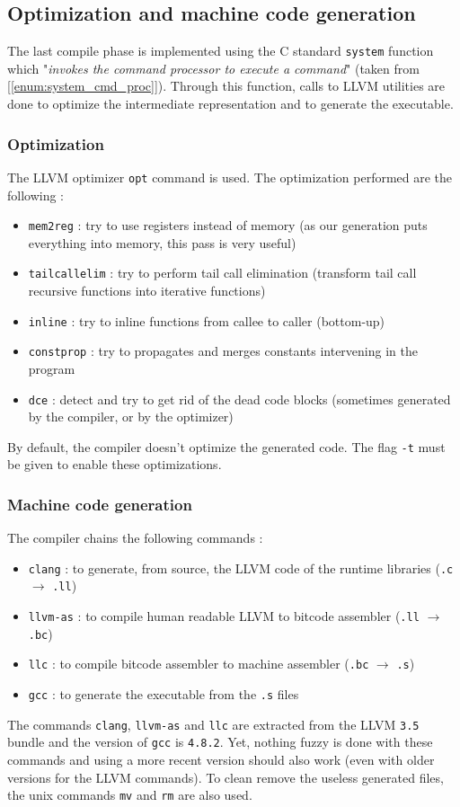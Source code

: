 \documentclass[a4paper,11pt]{article}
\begin{document}
\subsection{Optimization and machine code generation}
The last compile phase is implemented using the C standard \texttt{system} function which "\textit{invokes the command processor to execute a command}" (taken from [\ref{enum:system_cmd_proc}]). Through this function, calls to LLVM utilities are done to optimize the intermediate representation and to generate the executable.
\subsubsection{Optimization}
The LLVM optimizer \texttt{opt} command is used. The optimization performed are the following :
\begin{itemize}
	\item \texttt{mem2reg} : try to use registers instead of memory (as our generation puts everything into memory, this pass is very useful)
	\item \texttt{tailcallelim} : try to perform tail call elimination (transform tail call recursive functions into iterative functions)
	\item \texttt{inline} : try to inline functions from callee to caller (bottom-up)
	\item \texttt{constprop} : try to propagates and merges constants intervening in the program
	\item \texttt{dce} : detect and try to get rid of the dead code blocks (sometimes generated by the compiler, or by the optimizer)
\end{itemize}
By default, the compiler doesn't optimize the generated code. The flag \texttt{-t} must be given to enable these optimizations.
\subsubsection{Machine code generation}
The compiler chains the following commands :
\begin{itemize}
	\item \texttt{clang} : to generate, from source, the LLVM code of the runtime libraries (\texttt{.c} $\rightarrow$ \texttt{.ll})
	\item \texttt{llvm-as} : to compile human readable LLVM to bitcode assembler (\texttt{.ll} $\rightarrow$ \texttt{.bc})
	\item \texttt{llc} : to compile bitcode assembler to machine assembler (\texttt{.bc} $\rightarrow$ \texttt{.s})
	\item \texttt{gcc} : to generate the executable from the \texttt{.s} files
\end{itemize}
The commands \texttt{clang}, \texttt{llvm-as} and \texttt{llc} are extracted from the LLVM \texttt{3.5} bundle and the version of \texttt{gcc} is \texttt{4.8.2}. Yet, nothing fuzzy is done with these commands and using a more recent version should also work (even with older versions for the LLVM commands).
To clean remove the useless generated files, the unix commands \texttt{mv} and \texttt{rm} are also used.
\end{document}
